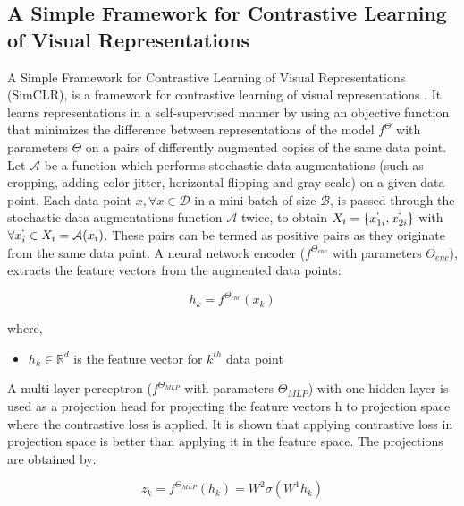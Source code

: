 \subsection{A Simple Framework for Contrastive Learning of Visual Representations}
A Simple Framework for Contrastive Learning of Visual Representations (SimCLR), is a framework for contrastive learning of visual representations \cite{chen2020}. It learns representations in a self-supervised manner by using an objective function that minimizes the difference between representations of the model $f^{\Theta}$ with parameters $\Theta$ on a pairs of differently augmented copies of the same data point. \\
Let $\mathcal{A}$ be a function which performs stochastic data augmentations (such as cropping, adding color jitter, horizontal flipping and gray scale) on a given data point. Each data point $x, \forall x \in \mathcal{D}$ in a mini-batch of size $\mathcal{B}$, is passed through the stochastic data augmentations function $\mathcal{A}$ twice, to obtain $X_i = \{x_{1i}^{`}, x_{2i}^{`}\}$ with $\forall x_i^{`} \in X_i = \mathcal{A}(x_i)$. These pairs can be termed as positive pairs as they originate from the same data point. A neural network encoder ($f^{\Theta_{enc}}$ with parameters $\Theta_{enc}$), extracts the feature vectors from the augmented data points:

\begin{equation}
    \label{equation:simclr_encoder}
    h_k = f^{\Theta_{enc}}(x_k)
\end{equation}

where,
\begin{itemize}[label={}]
  \setlength\itemsep{0em}
  \item $h_k \in \mathbb{R}^{d}$ is the feature vector for $k^{th}$ data point
\end{itemize}

A multi-layer perceptron ($f^{\Theta_{MLP}}$ with parameters $\Theta_{MLP}$) with one hidden layer is used as a projection head for projecting the feature vectors h to projection space where the contrastive loss is applied. It is shown\cite{chen2020} that applying contrastive loss in projection space is better than applying it in the feature space. The projections are obtained by:

\begin{equation}
    \label{equation:simclr_mlp}
    z_k = f^{\Theta_{MLP}}(h_k) = W^{2}\sigma(W^{1}h_k)
\end{equation}

